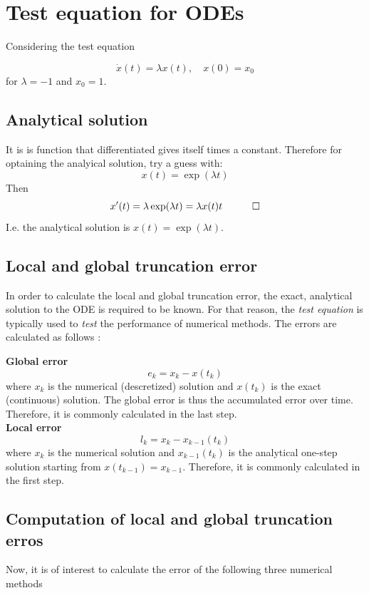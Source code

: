 \section{Test equation for ODEs}
Considering the test equation

$$
\dot{x}(t)=\lambda x(t), \quad x(0)=x_{0} \label{eq:test}
$$
for $\lambda=-1$ and $x_{0}=1$.

\subsection{Analytical solution}
It is is function that differentiated gives itself times a constant. Therefore for optaining the analyical solution, try a guess with:
$$
x(t) = \exp(\lambda t)
$$
Then
$$
x'(t) = \lambda \exp(\lambda t) = \lambda x(t)t  \quad \qed
$$
I.e. the analytical solution is $x(t) = \exp(\lambda t)$.

\subsection{Local and global truncation error}
In order to calculate the local and global truncation error, the exact, analytical solution to the ODE is required to be known. For that reason, the \textit{test equation} is typically used to \textit{test} the performance of numerical methods. The errors are calculated as follows \cite{JrgensenScientificEquations}:

\textbf{Global error}
$$
e_{k}=x_{k}-x\left(t_{k}\right)
$$
where $x_{k}$ is the numerical (descretized) solution and $x\left(t_{k}\right)$ is the exact (continuous) solution. The global error is thus the accumulated error over time. Therefore, it is commonly calculated in the last step.
\\

\textbf{Local error}
$$
l_{k}=x_{k}-x_{k-1}\left(t_{k}\right)
$$
where $x_{k}$ is the numerical solution and $x_{k-1}\left(t_{k}\right)$ is the analytical one-step solution starting from $x\left(t_{k-1}\right)=x_{k-1}$. Therefore, it is commonly calculated in the first step.
\\

\subsection{Computation of local and global truncation erros}

Now, it is of interest to calculate the error of the following three numerical methods
\\

